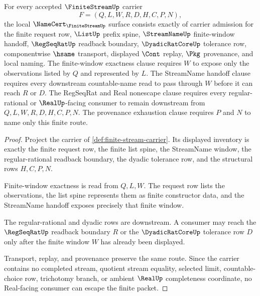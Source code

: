 \begin{theorem}
\label{thm:finite-stream-namecert-obligations}
For every accepted $\FiniteStreamUp$ carrier
$$
F=(Q,L,W,R,D,H,C,P,N),
$$
the local $\NameCert_{\FiniteStreamUp}$ surface consists exactly of carrier admission for the finite request row, $\ListUp$ prefix spine, $\StreamNameUp$ finite-window handoff, $\RegSeqRatUp$ readback boundary, $\DyadicRatCoreUp$ tolerance row, componentwise $\hsame$ transport, displayed $\Cont$ replay, $\Pkg$ provenance, and local naming. The finite-window exactness clause requires $W$ to expose only the observations listed by $Q$ and represented by $L$. The StreamName handoff clause requires every downstream countable-name read to pass through $W$ before it can reach $R$ or $D$. The RegSeqRat and Real nonescape clause requires every regular-rational or $\RealUp$-facing consumer to remain downstream from $Q,L,W,R,D,H,C,P,N$. The provenance exhaustion clause requires $P$ and $N$ to name only this finite route.
\end{theorem}
\begin{proof}
Project the carrier of \autoref{def:finite-stream-carrier}. Its displayed inventory is exactly the finite request row, the finite list spine, the StreamName window, the regular-rational readback boundary, the dyadic tolerance row, and the structural rows $H,C,P,N$.

Finite-window exactness is read from $Q,L,W$. The request row lists the observations, the list spine represents them as finite constructor data, and the StreamName handoff exposes precisely that finite window.

The regular-rational and dyadic rows are downstream. A consumer may reach the $\RegSeqRatUp$ readback boundary $R$ or the $\DyadicRatCoreUp$ tolerance row $D$ only after the finite window $W$ has already been displayed.

Transport, replay, and provenance preserve the same route. Since the carrier contains no completed stream, quotient stream equality, selected limit, countable-choice row, trichotomy branch, or ambient $\RealUp$ completeness coordinate, no Real-facing consumer can escape the finite packet.
\end{proof}

